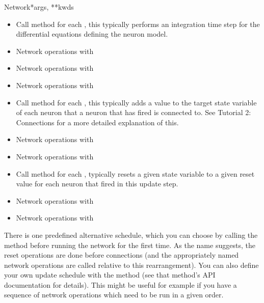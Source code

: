 \documentclass[letterpaper,10pt]{manual}
\begin{document}
\begin{classdesc}{Network}{*args, **kwds}
\begin{itemize}
\item {} 
Call  method for each \hyperlink{brian.NeuronGroup}{}, this typically
performs an integration time step for the differential equations
defining the neuron model.

\item {} 
Network operations with 

\item {} 
Network operations with 

\item {} 
Network operations with 

\item {} 
Call  method for each \hyperlink{brian.Connection}{}, this
typically adds a value to the target state variable of each neuron
that a neuron that has fired is connected to. See Tutorial 2: Connections for
a more detailed explanation of this.

\item {} 
Network operations with 

\item {} 
Network operations with 

\item {} 
Call  method for each \hyperlink{brian.NeuronGroup}{}, typically resets a
given state variable to a given reset value for each neuron that fired
in this update step.

\item {} 
Network operations with 

\item {} 
Network operations with 

\end{itemize}

There is one predefined alternative schedule, which you can choose by calling
the  method before running the
network for the first time. As the name suggests, the reset operations are
done before connections (and the appropriately named network operations are
called relative to this rearrangement). You can also define your own update
schedule with the  method (see that method's API documentation for
details). This might be useful for example if you have a sequence of network
operations which need to be run in a given order.
\end{classdesc}
\end{document}
